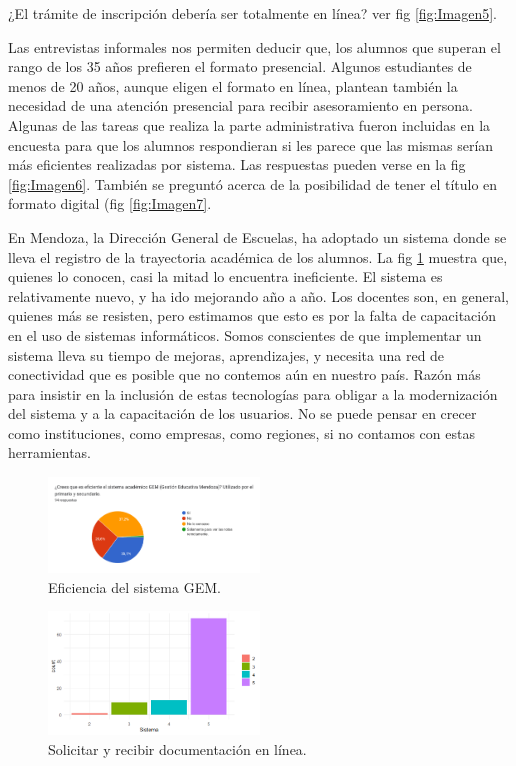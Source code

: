 \documentclass[a4paper]{article}
\begin{document}
¿El trámite de inscripción debería ser totalmente en línea? ver fig \ref{fig:Imagen5}. 

Las entrevistas informales nos permiten deducir que, los alumnos que superan el rango de los 35 años prefieren el formato presencial. Algunos estudiantes de menos de 20 años, aunque eligen el formato en línea, plantean también la necesidad de una atención presencial para recibir asesoramiento en persona. 
Algunas de las tareas que realiza la parte administrativa fueron incluidas en la encuesta para que los alumnos respondieran si les parece que las mismas serían más eficientes realizadas por sistema. Las respuestas pueden verse en la fig \ref{fig:Imagen6}. También se preguntó acerca de la posibilidad de tener el título en formato digital (fig \ref{fig:Imagen7}. 

En Mendoza, la Dirección General de Escuelas, ha adoptado un sistema donde se lleva el registro de la trayectoria académica de los alumnos. La fig \ref{fig:Imagen8} muestra que, quienes lo conocen, casi la mitad lo encuentra ineficiente. El sistema es relativamente nuevo, y ha ido mejorando año a año. Los docentes son, en general, quienes más se resisten, pero estimamos que esto es por la falta de capacitación en el uso de sistemas informáticos. 
Somos conscientes de que implementar un sistema lleva su tiempo de mejoras, aprendizajes, y necesita una red de conectividad que es posible que no contemos aún en nuestro país. Razón más para insistir en la inclusión de estas tecnologías para obligar a la modernización del sistema y a la capacitación de los usuarios. No se puede pensar en crecer como instituciones, como empresas, como regiones, si no contamos con estas herramientas. 

\begin{figure}
\centering
\includegraphics[width=0.5\textwidth]{Imagen8.png}
\caption{\label{fig:Imagen8}Eficiencia del sistema GEM.}
\end{figure}
\begin{figure}
\centering
\includegraphics[width=0.5\textwidth]{Imagen9.png}
\caption{\label{fig:Imagen9}Solicitar y recibir documentación en línea.}
\end{figure}
\end{document}
